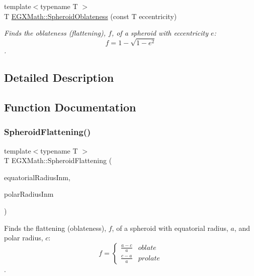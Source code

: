 \begin{DoxyCompactItemize}
{\footnotesize template$<$typename T $>$ }\\T \mbox{\hyperlink{group___e_g_x_math-_geometry-3_d-_spheroid-_flattening_ga486adfc58b047197daf87f50b2039ca7}{E\+G\+X\+Math\+::\+Spheroid\+Oblateness}} (const T eccentricity)
\begin{DoxyCompactList}\small\item\em Finds the oblateness (flattening), $f$, of a spheroid with eccentricity $e$\+: \[ f = 1 - \sqrt{1-e^2} \]. \end{DoxyCompactList}\end{DoxyCompactItemize}


\subsection{Detailed Description}


\subsection{Function Documentation}
\mbox{\label{group___e_g_x_math-_geometry-3_d-_spheroid-_flattening_ga05e3be91f5f7fbaa9371687aa3834179}} 
\subsubsection{\texorpdfstring{Spheroid\+Flattening()}{SpheroidFlattening()}\hspace{0.1cm}{\footnotesize\ttfamily [1/2]}}
{\footnotesize\ttfamily template$<$typename T $>$ \\
T E\+G\+X\+Math\+::\+Spheroid\+Flattening (\begin{DoxyParamCaption}\item[{const T}]{equatorial\+Radius\+Inm,  }\item[{const T}]{polar\+Radius\+Inm }\end{DoxyParamCaption})}



Finds the flattening (oblateness), $f$, of a spheroid with equatorial radius, $a$, and polar radius, $c$\+: \[ f =\begin{cases} \frac{a-c}{a}{} & oblate \\ \frac{c-a}{a} & prolate \end{cases} \]. 


